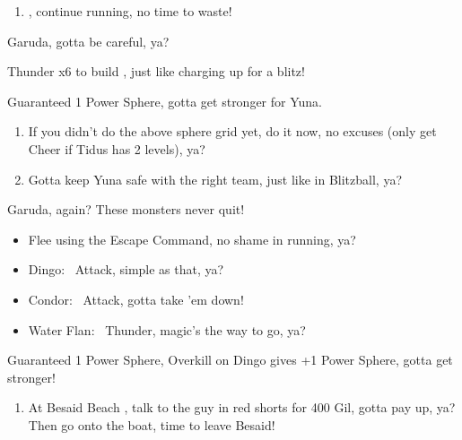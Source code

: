 \begin{enumerate}[resume]
    \item \sd, continue running, no time to waste!
\end{enumerate}
\begin{battle}{Garuda, gotta be careful, ya?}
    \begin{itemize}
        \summon{\valefor}
        \valeforf Thunder x6 to build \od, just like charging up for a blitz!
    \end{itemize}
    Guaranteed 1 Power Sphere, gotta get stronger for Yuna.
\end{battle}
\begin{enumerate}[resume]
    \item If you didn't do the above sphere grid yet, do it now, no excuses (only get Cheer if Tidus has 2 levels), ya?
    \item \formation{\tidus}{\yuna}{\lulu} Gotta keep Yuna safe with the right team, just like in Blitzball, ya?
\end{enumerate}
\begin{battle}{Garuda, again? These monsters never quit!}
    \begin{itemize}
        \item Flee using the Escape Command, no shame in running, ya?
    \end{itemize}
\end{battle}
\begin{encounters}
    \begin{itemize}
        \item Dingo: \tidus\ Attack, simple as that, ya?
        \item Condor: \wakka\ Attack, gotta take 'em down!
        \item Water Flan: \lulu\ Thunder, magic's the way to go, ya?
    \end{itemize}
    Guaranteed 1 Power Sphere, Overkill on Dingo gives +1 Power Sphere, gotta get stronger!
\end{encounters}
\begin{enumerate}[resume]
    \item At Besaid Beach \save, talk to the guy in red shorts for 400 Gil, gotta pay up, ya? Then go onto the boat, time to leave Besaid!
\end{enumerate}
\winnp\lossnp\bothnp